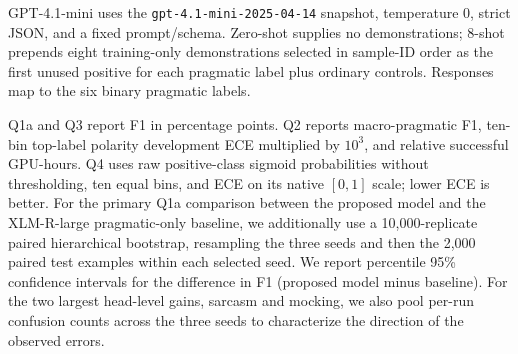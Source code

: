 GPT-4.1-mini uses the \texttt{gpt-4.1-mini-2025-04-14} snapshot, temperature 0, strict JSON, and a fixed prompt/schema. Zero-shot supplies no demonstrations; 8-shot prepends eight training-only demonstrations selected in sample-ID order as the first unused positive for each pragmatic label plus ordinary controls. Responses map to the six binary pragmatic labels.

Q1a and Q3 report F1 in percentage points. Q2 reports macro-pragmatic F1, ten-bin top-label polarity development ECE multiplied by $10^3$, and relative successful GPU-hours. Q4 uses raw positive-class sigmoid probabilities without thresholding, ten equal bins, and ECE on its native $[0,1]$ scale; lower ECE is better. For the primary Q1a comparison between the proposed model and the XLM-R-large pragmatic-only baseline, we additionally use a 10,000-replicate paired hierarchical bootstrap, resampling the three seeds and then the 2,000 paired test examples within each selected seed. We report percentile 95\% confidence intervals for the difference in F1 (proposed model minus baseline). For the two largest head-level gains, sarcasm and mocking, we also pool per-run confusion counts across the three seeds to characterize the direction of the observed errors.
